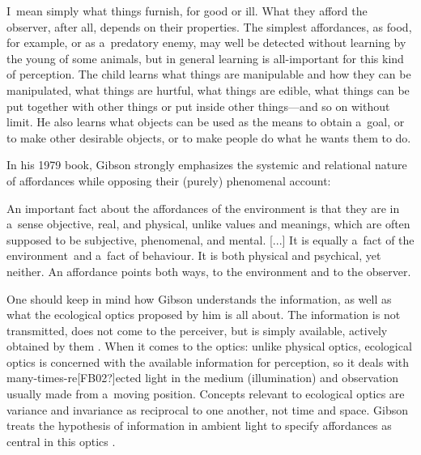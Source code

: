 \documentclass[%
manuscript=article,
year=2024,
volume=77,
doi=00000.000,
]{zfn}
\begin{document}
I~mean simply what things furnish, for good or ill. What they afford the observer, after all, depends on their properties. The simplest affordances, as food, for example, or as a~predatory enemy, may well be detected without learning by the young of some animals, but in general learning is all-important for this kind of perception. The child learns what things are manipulable and how they can be manipulated, what things are hurtful, what things are edible, what things can be put together with other things or put inside other things---and so on without limit. He also learns what objects can be used as the means to obtain a~goal, or to make other desirable objects, or to make people do what he wants them to do. 
\parencite[][p.285]{gibson_senses_1966}%




In his 1979 book, Gibson strongly emphasizes the systemic and relational nature of affordances while opposing their (purely) phenomenal account:



An important fact about the affordances of the environment is that they are in a~sense objective, real, and physical, unlike values and meanings, which are often supposed to be subjective, phenomenal, and mental. [...] It is equally a~fact of the environment~and a~fact of behaviour. It is both physical and psychical, yet neither. An affordance points both ways, to the environment and to the observer. 
\parencite[][p.129]{gibson_ecological_1979}%




One should keep in mind how Gibson understands the information, as well as what the ecological optics proposed by him is all about. The information is not transmitted, does not come to the perceiver, but is simply available, actively obtained by them 
\parencite[][p.307]{gibson_ecological_1979}. %
 When it comes to the optics: unlike physical optics, ecological optics is concerned with the available information for perception, so it deals with many-times-re[FB02?]ected light in the medium (illumination) and observation usually made from a~moving position. Concepts relevant to ecological optics are variance and invariance as reciprocal to one another, not time and space. Gibson treats the hypothesis of information in ambient light to specify affordances as central in this optics 
\parencite[][pp.47–64]{}.%
\end{document}
